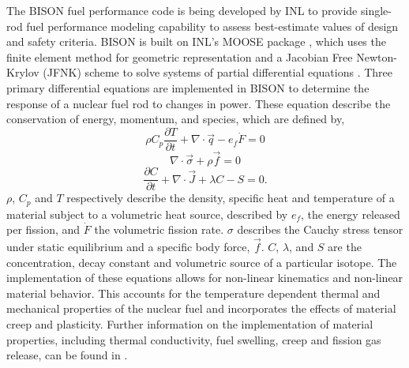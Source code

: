 \documentclass[edeposit,fullpage,11pt]{uiucthesis2009}
\begin{document}
The BISON fuel performance code is being developed by \gls{INL} to provide single-rod fuel performance modeling capability to assess best-estimate values of design and safety criteria. 
BISON is built on \gls{INL}'s \gls{MOOSE} package \cite{gaston_moose:_2009}, which uses the finite element method for geometric representation and a Jacobian Free Newton-Krylov (JFNK) scheme to solve systems of partial differential equations \cite{williamson_multidimensional_2012}. 
Three primary differential equations are implemented in BISON to determine the response of a nuclear fuel rod to changes in  power.
These equation describe the conservation of energy, momentum, and species, which are defined by,
\begin{equation} \label{eqn:bis_eng}
\rho C_p \frac{\partial T}{\partial t} + \nabla \cdot \vec{q} - e_f \dot{F} =0
\end{equation} 
\begin{equation} \label{eqn:bis_mom}
\nabla \cdot \vec{\sigma} + \rho \vec{f} =0
\end{equation} 
\begin{equation} \label{eqn:bis_spec}
\frac{\partial C}{\partial t} + \nabla \cdot \vec{J} +\lambda C - S =0.
\end{equation} 
$\rho$, $C_p$ and $T$ respectively describe the density, specific heat and temperature of a material subject to a volumetric heat source, described by $e_f$, the energy released per fission, and $\dot{F}$ the volumetric fission rate.
$\sigma$ describes the Cauchy stress tensor under static equilibrium and a specific body force, $\vec{f}$.
$C$, $\lambda$, and $S$ are the concentration, decay constant and volumetric source of a particular isotope.
The implementation of these equations allows for non-linear kinematics and non-linear material behavior.
This accounts for the temperature dependent thermal and mechanical properties of the nuclear fuel and incorporates the effects of material creep and plasticity.
Further information on the implementation of material properties, including thermal conductivity, fuel swelling, creep and fission gas release, can be found in \cite{williamson_bison_year,williamson_manual}.
\end{document}
